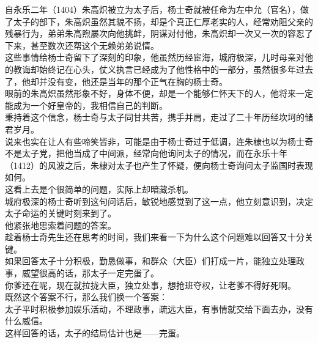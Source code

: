 \begin{multicols}{\theparacolNo}
自永乐二年（1404）朱高炽被立为太子后，杨士奇就被任命为左中允（官名），做了太子的部下，朱高炽虽然其貌不扬，却是个真正仁厚老实的人，经常劝阻父亲的残暴行为，弟弟朱高煦屡次向他挑衅，阴谋对付他，朱高炽却一次又一次的容忍了下来，甚至数次还帮这个无赖弟弟说情。\\

这些事情给杨士奇留下了深刻的印象，他虽然历经宦海，城府极深，儿时母亲对他的教诲却始终记在心头，仗义执言已经成为了他性格中的一部分，虽然很多年过去了，他却并没有变，他还是当年的那个正气在胸的杨士奇。\\

眼前的朱高炽虽然形象不好，身体不便，却是一个能够仁怀天下的人，他将来一定能成为一个好皇帝的，我相信自己的判断。\\

秉持着这个信念，杨士奇与太子同甘共苦，携手并肩，走过了二十年历经坎坷的储君岁月。\\

说来也实在让人有些啼笑皆非，可能是由于杨士奇过于低调，连朱棣也以为杨士奇不是太子党，把他当成了中间派，经常向他询问太子的情况，而在永乐十年（1412）的风波之后，朱棣对太子也产生了怀疑，便向杨士奇询问太子监国时表现如何。\\

这看上去是个很简单的问题，实际上却暗藏杀机。\\

城府极深的杨士奇听到这句问话后，敏锐地感觉到了这一点，他立刻意识到，决定太子命运的关键时刻来到了。\\

他紧张地思索着问题的答案。\\

趁着杨士奇先生还在思考的时间，我们来看一下为什么这个问题难以回答又十分关键。\\

如果回答太子十分积极，勤恳做事，和群众（大臣）们打成一片，能独立处理政事，威望很高的话，那太子一定完蛋了。\\

你爹还在呢，现在就拉拢大臣，独立处事，想抢班夺权，让老爹不得好死啊。\\

既然这个答案不行，那么我们换一个答案：\\

太子平时积极参加娱乐活动，不理政事，疏远大臣，有事情就交给下面去办，没有什么威信。\\

这样回答的话，太子的结局估计也是——完蛋。\\


\end{multicols}
